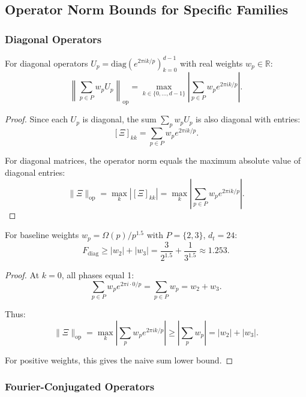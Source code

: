\documentclass[11pt,a4paper]{article}
\begin{document}
\subsection{Operator Norm Bounds for Specific Families}

\subsubsection{Diagonal Operators}

\begin{proposition}
\label{prop:diagonal-norm}
For diagonal operators \(U_p = \mathrm{diag}(e^{2\pi i k/p})_{k=0}^{d-1}\) with real weights \(w_p \in \mathbb{R}\):
\[
\left\| \sum_{p \in P} w_p U_p \right\|_{\mathrm{op}} = \max_{k \in \{0, \ldots, d-1\}} \left| \sum_{p \in P} w_p e^{2\pi i k/p} \right|.
\]
\end{proposition}

\begin{proof}
Since each \(U_p\) is diagonal, the sum \(\sum_p w_p U_p\) is also diagonal with entries:
\[
[\Xi]_{kk} = \sum_{p \in P} w_p e^{2\pi i k/p}.
\]

For diagonal matrices, the operator norm equals the maximum absolute value of diagonal entries:
\[
\|\Xi\|_{\mathrm{op}} = \max_k |[\Xi]_{kk}| = \max_k \left| \sum_{p \in P} w_p e^{2\pi i k/p} \right|.
\]
\end{proof}

\begin{corollary}
For baseline weights \(w_p = \Omega(p)/p^{1.5}\) with \(P = \{2, 3\}\), \(d_t = 24\):
\[
F_{\text{diag}} \geq |w_2| + |w_3| = \frac{3}{2^{1.5}} + \frac{1}{3^{1.5}} \approx 1.253.
\]
\end{corollary}

\begin{proof}
At \(k=0\), all phases equal 1:
\[
\sum_{p \in P} w_p e^{2\pi i \cdot 0/p} = \sum_{p \in P} w_p = w_2 + w_3.
\]

Thus:
\[
\|\Xi\|_{\mathrm{op}} = \max_k \left| \sum_p w_p e^{2\pi i k/p} \right| \geq \left| \sum_p w_p \right| = |w_2| + |w_3|.
\]

For positive weights, this gives the naive sum lower bound.
\end{proof}

\subsubsection{Fourier-Conjugated Operators}
\end{document}

